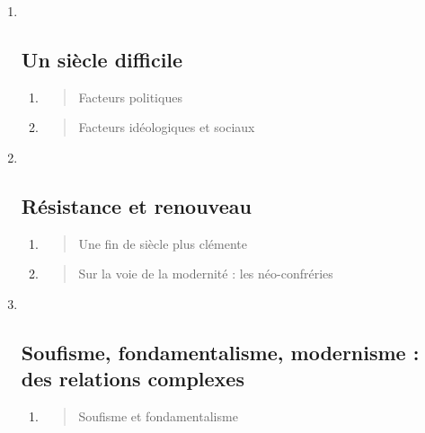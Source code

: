  
\begin{enumerate}
\def\labelenumi{\Roman{enumi}.}
\item ~
  \hypertarget{un-siuxe8cle-difficile}{%
  \subsection{\texorpdfstring{{Un siècle
  difficile}}{Un siècle difficile}}\label{un-siuxe8cle-difficile}}

  \begin{enumerate}
  \def\labelenumii{\arabic{enumii}.}
  \item
    \begin{quote}
    Facteurs politiques
    \end{quote}
  \item
    \begin{quote}
    Facteurs idéologiques et sociaux
    \end{quote}
  \end{enumerate}
\item ~
  \hypertarget{ruxe9sistance-et-renouveau}{%
  \subsection{\texorpdfstring{{Résistance et
  renouveau}}{Résistance et renouveau}}\label{ruxe9sistance-et-renouveau}}

  \begin{enumerate}
  \def\labelenumii{\arabic{enumii}.}
  \item
    \begin{quote}
    Une fin de siècle plus clémente
    \end{quote}
  \item
    \begin{quote}
    Sur la voie de la modernité : les néo-confréries
    \end{quote}
  \end{enumerate}
\item ~
  \hypertarget{soufisme-fondamentalisme-modernisme-des-relations-complexes}{%
  \subsection{\texorpdfstring{{Soufisme, fondamentalisme,
  modernisme : des relations
  complexes}}{Soufisme, fondamentalisme, modernisme : des relations complexes}}\label{soufisme-fondamentalisme-modernisme-des-relations-complexes}}

  \begin{enumerate}
  \def\labelenumii{\arabic{enumii}.}
  \item
    \begin{quote}
    Soufisme et fondamentalisme
    \end{quote}
  \end{enumerate}
\end{enumerate}


